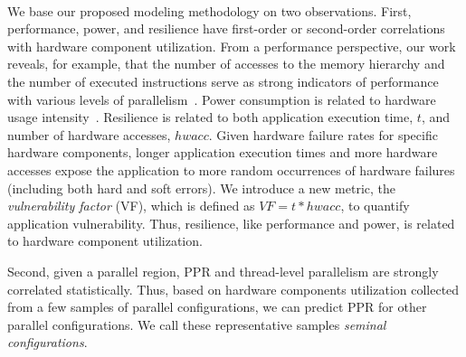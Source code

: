 \documentclass{article}  %
\begin{document}


\vspace{10pt}

  \\
We base our proposed modeling methodology on two observations.
First, performance, power, and resilience have first-order or
second-order correlations with hardware component utilization.
From a performance perspective, our work reveals, for example, that
the number of accesses to the memory hierarchy and the number of
executed instructions serve as strong indicators of performance with
various levels of 
parallelism~\cite{mpiopenmp_tpds13, mpiopenmp_ipdps10, dct_pmbs11, dct_iiswc12}. 
Power consumption is related to hardware usage 
intensity~\cite{leon:14:characterizing,mpiopenmp_tpds13, powermodel_sigmetrics03, powermodel_micro03}.
Resilience is related to both application execution time, $t$, and number of 
hardware accesses, $hwacc$. Given hardware failure rates for specific hardware
components, longer application execution times and more hardware accesses 
expose the application to more random occurrences of hardware failures 
(including both hard and soft errors). We introduce a new metric, the
\textit{vulnerability factor} (VF), which is defined as $VF = t*hwacc$, 
to quantify application vulnerability. Thus, resilience,
like performance and power, is related to hardware component utilization.

 
Second, given a parallel region, PPR and thread-level parallelism are
strongly correlated  statistically. Thus, based on hardware components 
utilization collected from a few samples of parallel configurations, 
we can predict PPR for other parallel configurations. 
We call these representative samples \textit{seminal configurations}.
\end{document}
